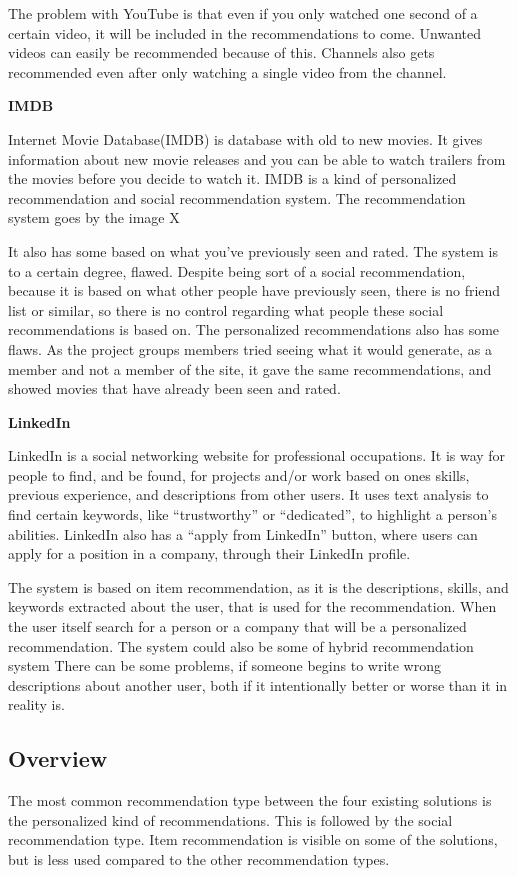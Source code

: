 The problem with YouTube is that even if you only watched one second of a certain video, it will be included in the recommendations to come. Unwanted videos can easily be recommended because of this. Channels also gets recommended even after only watching a single video from the channel.

\textbf{IMDB}

Internet Movie Database(IMDB) is database with old to new movies. It gives information about new movie releases and you can be able to watch trailers from the movies before you decide to watch it. IMDB is a kind of  personalized recommendation and social recommendation system. The recommendation system goes by the image X

It also has some based on what you’ve previously seen and rated. The system is to a certain degree, flawed. Despite being sort of a social recommendation, because it is based on what other people have previously seen, there is no friend list or similar, so there is no control regarding what people these social recommendations is based on. The personalized recommendations also has some flaws. As the project groups members tried seeing what it would generate, as a member and not a member of the site, it gave the same recommendations, and showed movies that have already been seen and rated.

\textbf{LinkedIn}

LinkedIn is a social networking website for professional occupations. It is way for people to find, and be found, for projects and/or work based on ones skills, previous experience, and descriptions from other users. It uses text analysis to find certain keywords, like “trustworthy” or “dedicated”, to highlight a person's abilities. LinkedIn also has a “apply from LinkedIn” button, where users can apply for a position in a company, through their LinkedIn profile. 

The system is based on item recommendation, as it is the descriptions, skills, and keywords extracted about the user, that is used for the recommendation. When the user itself search for a person or a company that will be a personalized recommendation. The system could also be some of hybrid recommendation system There can be some problems, if someone begins to write wrong descriptions about another user, both if it intentionally better or worse than it in reality is.

\subsection{Overview}
The most common recommendation type between the four existing solutions is the personalized kind of recommendations. This is followed by the social recommendation type. Item recommendation is visible on some of the solutions, but is less used compared to the other recommendation types.

